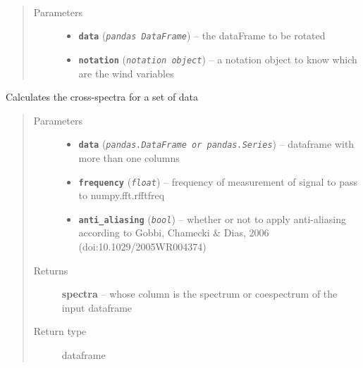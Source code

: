 \documentclass[a4paper,10pt,oneside]{sphinxmanual}
\begin{document}

\begin{fulllineitems}
\label{pymicra:pymicra.data.rotate2D}~\begin{quote}\begin{description}
\item[{Parameters}] \leavevmode\begin{itemize}
\item {} 
\textbf{\texttt{data}} (\emph{\texttt{pandas DataFrame}}) -- the dataFrame to be rotated

\item {} 
\textbf{\texttt{notation}} (\emph{\texttt{notation object}}) -- a notation object to know which are the wind variables

\end{itemize}

\end{description}\end{quote}

\end{fulllineitems}


\begin{fulllineitems}
\label{pymicra:pymicra.data.spectra}
Calculates the cross-spectra for a set of data
\begin{quote}\begin{description}
\item[{Parameters}] \leavevmode\begin{itemize}
\item {} 
\textbf{\texttt{data}} (\emph{\texttt{pandas.DataFrame or pandas.Series}}) -- dataframe with more than one columns

\item {} 
\textbf{\texttt{frequency}} (\emph{\texttt{float}}) -- frequency of measurement of signal to pass to numpy.fft.rfftfreq

\item {} 
\textbf{\texttt{anti\_aliasing}} (\emph{\texttt{bool}}) -- whether or not to apply anti-aliasing according to Gobbi, Chamecki \& Dias, 2006 (doi:10.1029/2005WR004374)

\end{itemize}

\item[{Returns}] \leavevmode
\textbf{spectra} -- whose column is the spectrum or coespectrum of the input dataframe

\item[{Return type}] \leavevmode
dataframe

\end{description}\end{quote}

\end{fulllineitems}
\end{document}
